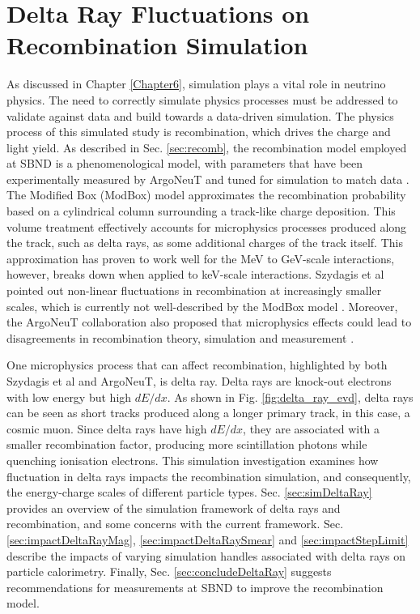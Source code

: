 
\section{Delta Ray Fluctuations on Recombination Simulation}
\label{sec7:delta}

As discussed in Chapter \ref{Chapter6}, simulation plays a vital role in neutrino physics.
The need to correctly simulate physics processes must be addressed to validate against data and build towards a data-driven simulation.
The physics process of this simulated study is recombination, which drives the charge and light yield.                                              
As described in Sec. \ref{sec:recomb}, the recombination model employed at SBND is a phenomenological model, with parameters that have been experimentally measured by ArgoNeuT and tuned for simulation to match data \cite{argoneut_recomb}.
The Modified Box (ModBox) model approximates the recombination probability based on a cylindrical column surrounding a track-like charge deposition.
This volume treatment effectively accounts for microphysics processes produced along the track, such as delta rays, as some additional charges of the track itself.
This approximation has proven to work well for the MeV to GeV-scale interactions, however, breaks down when applied to keV-scale interactions.
Szydagis et al pointed out non-linear fluctuations in recombination at increasingly smaller scales, which is currently not well-described by the ModBox model \cite{NEST}.   
Moreover, the ArgoNeuT collaboration also proposed that microphysics effects could lead to disagreements in recombination theory, simulation and measurement \cite{argoneut_recomb}.

One microphysics process that can affect recombination, highlighted by both Szydagis et al and ArgoNeuT, is delta ray.
Delta rays are knock-out electrons with low energy but high $dE/dx$.
As shown in Fig. \ref{fig:delta_ray_evd}, delta rays can be seen as short tracks produced along a longer primary track, in this case, a cosmic muon.                      
Since delta rays have high $dE/dx$, they are associated with a smaller recombination factor, producing more scintillation photons while quenching ionisation electrons.
This simulation investigation examines how fluctuation in delta rays impacts the recombination simulation, and consequently, the energy-charge scales of different particle types.
Sec. \ref{sec:simDeltaRay} provides an overview of the simulation framework of delta rays and recombination, and some concerns with the current framework.
Sec. \ref{sec:impactDeltaRayMag}, \ref{sec:impactDeltaRaySmear} and \ref{sec:impactStepLimit} describe the impacts of varying simulation handles associated with delta rays on particle calorimetry.
Finally, Sec. \ref{sec:concludeDeltaRay} suggests recommendations for measurements at SBND to improve the recombination model.             
                                                                                                                       
